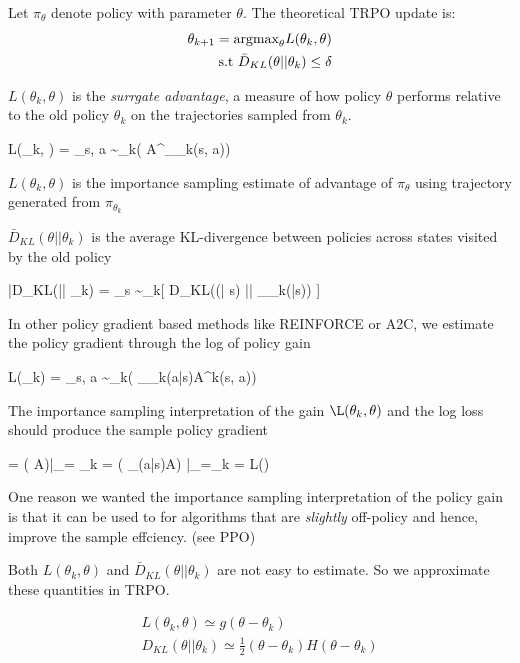 \documentclass{article}
\let\[\relax \let\]\relax %
\DeclareRobustCommand{\[}{\begin{equation}}
\DeclareRobustCommand{\]}{\end{equation}}
\begin{document}
Let $\pi_{\theta}$ denote policy with parameter $\theta$. The theoretical
TRPO update is:
\begin{align}
\theta_{k+1} = \text{argmax}_{\theta}L(\theta_k, \theta) \\
\text{s.t } \bar D_{KL}(\theta || \theta_k) \le \delta
\end{align}

$L(\theta_k, \theta)$ is the \emph{surrgate advantage}, a measure of how 
policy $\theta$ performs relative to the old policy $\theta_k$
on the trajectories sampled from $\theta_k$. 

\[
L(\theta_k, \theta) = \E_{s, a \sim \theta_k}( A^{\pi_{\theta_k}}(s, a))
\]

$L(\theta_k, \theta)$ is the importance sampling estimate of
advantage of $\pi_{\theta}$ using trajectory generated from
$\pi_{\theta_k}$

$\bar D_{KL}(\theta||\theta_k)$ is the average KL-divergence 
between policies across states visited by the old policy

\[
\bar D_{KL}(\theta || \theta_k) = \E_{s \sim \pi_k}[
    D_{KL}(\pi(\cdot | s) || \pi_{\theta_k}(\cdot |s))
    ]
\]

In other policy gradient based methods like REINFORCE or A2C, we
estimate the policy gradient through the log of policy gain

\[
L(\theta_k) = \E_{s, a \sim \theta_k}(
\log \pi_{\theta_k}(a|s)A^{k}(s, a))
\]

The importance sampling interpretation of the gain
$\L(\theta_k, \theta)$ and the log loss should produce the 
sample policy gradient

\[
= \E ( 
{\partial \theta}A)|_{\theta = \theta_k} 
= \E (\frac{\partial}{\partial \theta} \log \pi_{\theta}(a|s)A) |_{\theta=\theta_k}
= \frac{\partial}{\partial \theta} L(\theta)
\]

One reason we wanted the importance sampling interpretation of the policy gain
is that it can be used to for algorithms that are \emph{slightly} off-policy 
and hence, improve the sample effciency. (see PPO)

Both $L(\theta_k, \theta)$ and $\bar D_{KL}(\theta || \theta_k)$
are not easy to estimate. So we approximate these quantities in
TRPO. 

\begin{align}
L(\theta_k, \theta) \simeq g(\theta - \theta_k) \\
D_{KL}(\theta || \theta_k)\simeq \frac{1}{2}(\theta-\theta_k) H 
(\theta - \theta_k)
\end{align}
\end{document}
